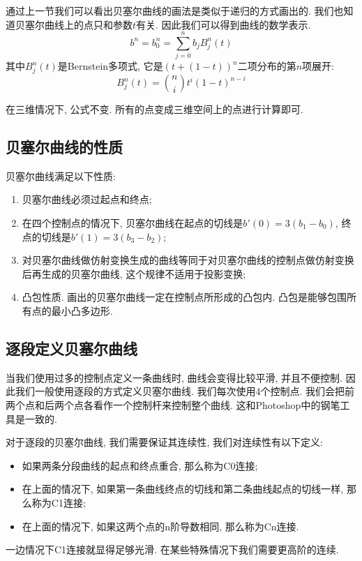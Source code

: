 通过上一节我们可以看出贝塞尔曲线的画法是类似于递归的方式画出的. 我们也知道贝塞尔曲线上的点只和参数$t$有关. 因此我们可以得到曲线的数学表示. 
\begin{equation}
	b^n=b_0^n=\sum_{j=0}^nb_jB_j^n(t)
\end{equation}
其中$B_j^n(t)$是Bernstein多项式, 它是$(t+(1-t))^n$二项分布的第$n$项展开: 
\begin{equation}
	B_j^n(t)=\binom{n}{i}t^i(1-t)^{n-i}
\end{equation}

在三维情况下, 公式不变. 所有的点变成三维空间上的点进行计算即可. 

\subsection{贝塞尔曲线的性质}
贝塞尔曲线满足以下性质: 
\begin{enumerate}
	\item 贝塞尔曲线必须过起点和终点; 
	\item 在四个控制点的情况下, 贝塞尔曲线在起点的切线是$b'(0)=3(b_1-b_0)$, 终点的切线是$b'(1)=3(b_3-b_2)$; 
	\item 对贝塞尔曲线做仿射变换生成的曲线等同于对贝塞尔曲线的控制点做仿射变换后再生成的贝塞尔曲线, 这个规律不适用于投影变换; 
	\item 凸包性质. 画出的贝塞尔曲线一定在控制点所形成的凸包内. 凸包是能够包围所有点的最小凸多边形. 
\end{enumerate}

\subsection{逐段定义贝塞尔曲线}
当我们使用过多的控制点定义一条曲线时, 曲线会变得比较平滑, 并且不便控制. 因此我们一般使用逐段的方式定义贝塞尔曲线. 我们每次使用4个控制点. 我们会把前两个点和后两个点各看作一个控制杆来控制整个曲线. 这和Photoshop中的钢笔工具是一致的. 

对于逐段的贝塞尔曲线, 我们需要保证其连续性, 我们对连续性有以下定义: 
\begin{itemize}
	\item 如果两条分段曲线的起点和终点重合, 那么称为C0连接; 
	\item 在上面的情况下, 如果第一条曲线终点的切线和第二条曲线起点的切线一样, 那么称为C1连接; 
	\item 在上面的情况下, 如果这两个点的n阶导数相同, 那么称为Cn连接. 
\end{itemize}
一边情况下C1连接就显得足够光滑. 在某些特殊情况下我们需要更高阶的连续. 

